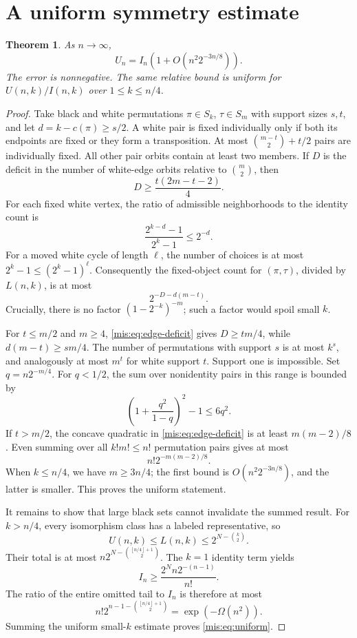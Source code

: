 \documentclass[11pt]{article}
\newtheorem{theorem}{Theorem}[section]
\theoremstyle{remark}\newtheorem{remark}[theorem]{Remark}
\newcommand{\floor}[1]{\left\lfloor #1\right\rfloor}
\begin{document}
\section{A uniform symmetry estimate}
\begin{theorem}\label{mis:thm:burnside}
As $n\to\infty$,
\begin{equation}\label{mis:eq:uniform}
 U_n=I_n\left(1+O(n^2 2^{-3n/8})\right).
\end{equation}
The error is nonnegative. The same relative bound is uniform for $U(n,k)/I(n,k)$ over $1\le k\le n/4$.
\end{theorem}
\begin{proof}
Take black and white permutations $\pi\in S_k$, $\tau\in S_m$ with support sizes $s,t$, and let $d=k-c(\pi)\ge s/2$. A white pair is fixed individually only if both its endpoints are fixed or they form a transposition. At most $\binom{m-t}{2}+t/2$ pairs are individually fixed. All other pair orbits contain at least two members. If $D$ is the deficit in the number of white-edge orbits relative to $\binom m2$, then
\begin{equation}\label{mis:eq:edge-deficit}
 D\ge \frac{t(2m-t-2)}4.
\end{equation}
For each fixed white vertex, the ratio of admissible neighborhoods to the identity count is
\[
 \frac{2^{k-d}-1}{2^k-1}\le2^{-d}.
\]
For a moved white cycle of length $\ell$, the number of choices is at most $2^k-1\le(2^k-1)^\ell$. Consequently the fixed-object count for $(\pi,\tau)$, divided by $L(n,k)$, is at most
\begin{equation}\label{mis:eq:joint-deficit}
 2^{-D-d(m-t)}.
\end{equation}
Crucially, there is no factor $(1-2^{-k})^{-m}$; such a factor would spoil small $k$.

For $t\le m/2$ and $m\ge4$, \eqref{mis:eq:edge-deficit} gives $D\ge tm/4$, while $d(m-t)\ge sm/4$. The number of permutations with support $s$ is at most $k^s$, and analogously at most $m^t$ for white support $t$. Support one is impossible. Set $q=n2^{-m/4}$. For $q<1/2$, the sum over nonidentity pairs in this range is bounded by
\[
 \left(1+\frac{q^2}{1-q}\right)^2-1\le6q^2.
\]
If $t>m/2$, the concave quadratic in \eqref{mis:eq:edge-deficit} is at least $m(m-2)/8$. Even summing over all $k!m!\le n!$ permutation pairs gives at most
\[
 n!2^{-m(m-2)/8}.
\]
When $k\le n/4$, we have $m\ge3n/4$; the first bound is $O(n^2 2^{-3n/8})$, and the latter is smaller. This proves the uniform statement.

It remains to show that large black sets cannot invalidate the summed result. For $k>n/4$, every isomorphism class has a labeled representative, so
\[
 U(n,k)\le L(n,k)\le2^{N-\binom k2}.
\]
Their total is at most $n2^{N-\binom{\floor{n/4}+1}{2}}$. The $k=1$ identity term yields
\[
 I_n\ge\frac{2^N n2^{-(n-1)}}{n!}.
\]
The ratio of the entire omitted tail to $I_n$ is therefore at most
\[
 n!2^{n-1-\binom{\floor{n/4}+1}{2}}=\exp(-\Omega(n^2)).
\]
Summing the uniform small-$k$ estimate proves \eqref{mis:eq:uniform}.
\end{proof}
\end{document}

